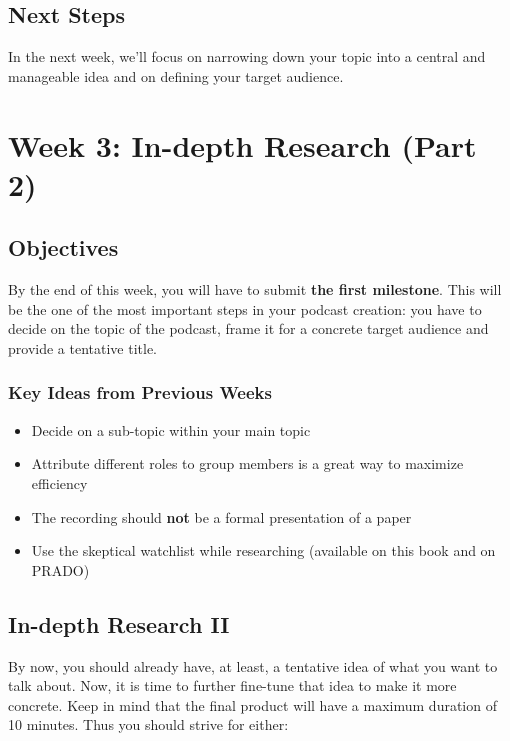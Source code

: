 \documentclass[
  letterpaper,
  DIV=11,
  numbers=noendperiod]{scrreprt}
\providecommand{\tightlist}{%
  \setlength{\itemsep}{0pt}\setlength{\parskip}{0pt}}\usepackage{longtable,booktabs,array}
\begin{document}
\section{Next Steps}\label{next-steps-2}

In the next week, we'll focus on narrowing down your topic into a
central and manageable idea and on defining your target audience.

\chapter{Week 3: In-depth Research (Part
2)}\label{week-3-in-depth-research-part-2-1}

\section{Objectives}\label{objectives-2}

By the end of this week, you will have to submit \textbf{the first
milestone}. This will be the one of the most important steps in your
podcast creation: you have to decide on the topic of the podcast, frame
it for a concrete target audience and provide a tentative title.

\subsection{Key Ideas from Previous
Weeks}\label{key-ideas-from-previous-weeks-1}

\begin{itemize}
\tightlist
\item
  Decide on a sub-topic within your main topic
\item
  Attribute different roles to group members is a great way to maximize
  efficiency
\item
  The recording should \textbf{not} be a formal presentation of a paper
\item
  Use the skeptical watchlist while researching (available on this book
  and on PRADO)
\end{itemize}

\section{In-depth Research II}\label{in-depth-research-ii}

By now, you should already have, at least, a tentative idea of what you
want to talk about. Now, it is time to further fine-tune that idea to
make it more concrete. Keep in mind that the final product will have a
maximum duration of 10 minutes. Thus you should strive for either:
\end{document}
